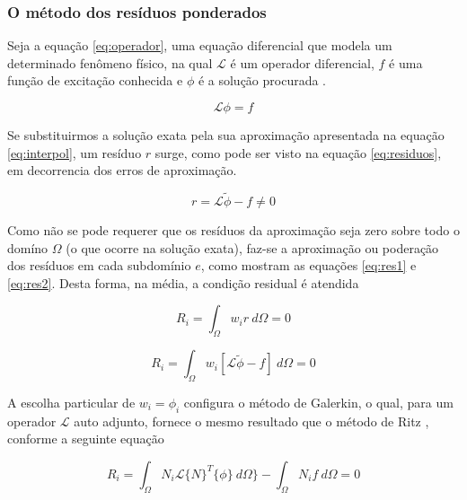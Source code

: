 \documentclass[
    12pt,               %
    openright,          %
    oneside,
    a4paper,            %
    english,            %
    french,             %
    spanish,            %
    brazil              %
    ]{abntex2}
\begin{document}
\subsubsection{O método dos resíduos ponderados}

Seja a equação \ref{eq:operador}, uma equação diferencial que modela um determinado fenômeno físico, na qual $\mathcal{L}$ é um operador diferencial, $f$ é uma função de excitação conhecida e $\phi$ é a solução procurada \cite[p. 20]{jin}\cite[p. 24]{volakis}.

 \begin{equation}
    \label{eq:operador}
    \mathcal{L} \phi = f
 \end{equation}
 
 Se substituirmos a solução exata pela sua aproximação apresentada na equação \ref{eq:interpol}, um resíduo $r$ surge, como pode ser visto na equação \ref{eq:residuos}, em decorrencia dos erros de aproximação.
 
  \begin{equation}
    \label{eq:residuos}
    r = \mathcal{L} \tilde{\phi} - f \neq 0
  \end{equation}

Como não se pode requerer que os resíduos da aproximação seja zero sobre todo o domíno $\Omega$ (o que ocorre na solução exata), faz-se a aproximação ou poderação dos resíduos em cada subdomínio $e$, como mostram as equações \ref{eq:res1} e \ref{eq:res2}. Desta forma, na média, a condição residual é atendida \cite[p. 28]{volakis}

  \begin{equation}
    \label{eq:res1}
    R_i = \int_{\Omega}{w_i r \ d\Omega} = 0
  \end{equation}
  
  \begin{equation}
    \label{eq:res2}
    R_i = \int_{\Omega}{w_i [\mathcal{L} \tilde{\phi} - f] \ d\Omega} = 0
  \end{equation}  


A escolha particular de $w_i = \phi_i$ configura o método de Galerkin, o qual, para um operador $\mathcal{L}$ auto adjunto, fornece o mesmo resultado que o método de Ritz  \cite[p. 22]{jin}, conforme a seguinte equação

  \begin{equation}
    \label{eq:galerkin}
    R_i = 
    \int_{\Omega}{N_i \mathcal{L} \{N\}^T \{\phi\} \ d\Omega\}} - \int_{\Omega}{N_i f \ d \Omega} = 0
  \end{equation}  
  
\end{document}
